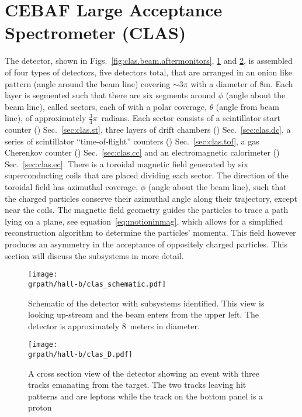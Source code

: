 \section{CEBAF Large Acceptance Spectrometer (CLAS)} \label{sec:tjnaf.clas}

The  detector, shown in Figs.~\ref{fig:clas.beam.aftermonitors}, \ref{fig:clas} and \ref{fig:clas.ced}, is assembled of four types of detectors, five detectors total,  that are arranged in an onion like pattern (angle around the beam line) covering $\sim 3\pi$ with a diameter of 8m. Each layer is segmented such that there are six segments around $\phi$ (angle about the beam line), called sectors, each of with a polar coverage, $\theta$ (angle from beam line), of approximately $\frac{3}{4}\pi$~radians. Each sector consists of a scintillator start counter () Sec.~\ref{sec:clas.st}, three layers of drift chambers () Sec.~\ref{sec:clas.dc}, a series of scintillator ``time-of-flight'' counters () Sec.~\ref{sec:clas.tof}, a gas Cherenkov counter () Sec.~\ref{sec:clas.cc} and an electromagnetic calorimeter () Sec.~\ref{sec:clas.ec}. There is a toroidal magnetic field generated by six superconducting coils that are placed dividing each sector. The direction of the toroidal field has azimuthal coverage, $\phi$ (angle about the beam line), such that the charged particles conserve their azimuthal angle along their trajectory, except near the coils. The magnetic field geometry guides the particles to trace a path lying on a plane, see equation~\ref{eq:motioninmag}, which allows for a simplified reconstruction algorithm to determine the particles' momenta. This field however produces an asymmetry in the acceptance of oppositely charged particles. This section will discuss the subsystems in more detail.


\begin{figure}\begin{center}
\texttt{[image: \\grpath/hall-b/clas\_schematic.pdf]}
\caption[ Detector]{\label{fig:clas}{}Schematic of the  detector\cite{clas} with subsystems identified. This view is looking up-stream and the beam enters from the upper left. The detector is approximately 8~meters in diameter.}
\end{center}\end{figure}

\begin{figure}\begin{center}
\texttt{[image: \\grpath/hall-b/clas\_D.pdf]}
\caption[ Detector Diagram]{\label{fig:clas.ced}A cross section view of the  detector showing an event with three tracks emanating from the target. The two tracks leaving hit patterns  and  are leptons while the track on the bottom panel is a proton}
\end{center}\end{figure}

